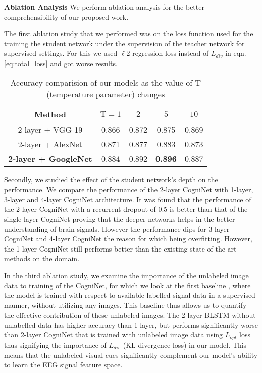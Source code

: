 \documentclass{article}
\begin{document}
\textbf{Ablation Analysis}
 We perform ablation analysis for the better comprehensibility of our proposed work.
 
The first ablation study that we performed was on the loss function used for the training the student network under the supervision of the teacher network for supervised settings. For this we used $\ell 2$ regression loss instead of $L_{div}$ in eqn. \ref{eq:total_loss} and got worse results.  
\begin{table}
\centering
\begin{tabular}{ccccc}
\hline
\textbf{Method} & \textbf{$\mathrm{T}=1$} & \textbf{$2$} & \textbf{$5$} & \textbf{$10$}\\
\hline
2-layer + VGG-19 & 0.866 & 0.872 & 0.875 & 0.869\\
2-layer + AlexNet & 0.871 & 0.877 & 0.883 & 0.873\\
\textbf{2-layer + GoogleNet} & 0.884 & 0.892 & \textbf{0.896} & 0.887\\
\hline
\end{tabular}
\caption{Accuracy comparision of our models as the value of T (temperature parameter) changes}
\label{tab: exp1}
\end{table}


Secondly, we studied the effect of the student network's depth on the performance. We compare the performance of the 2-layer CogniNet with 1-layer, 3-layer and 4-layer CogniNet architecture. It was found that the performance of the 2-layer CogniNet with a recurrent dropout of 0.5 is better than that of the single layer CogniNet proving that the deeper networks helps in the better understanding of brain signals. However the performance dips for 3-layer CogniNet and 4-layer CogniNet the reason for which being overfitting. However, the 1-layer CogniNet still performs better than the existing state-of-the-art methods on the domain.

In the third ablation study, we examine the importance of the unlabeled image data to training of the CogniNet, for which we look at the first baseline , where the model is trained with respect to available labelled signal data in a supervised manner, without utilizing any images. This baseline thus allows us to quantify the effective contribution of these unlabeled images. The 2-layer BLSTM without unlabelled data has higher accuracy than 1-layer, but performs significantly worse than 2-layer CogniNet that is trained with unlabeled image data using $L_{opt}$ loss thus signifying the importance of $L_{div}$ (KL-divergence loss) in our model. This means that the unlabeled visual cues significantly complement our model's ability to learn the EEG signal feature space.
\end{document}
